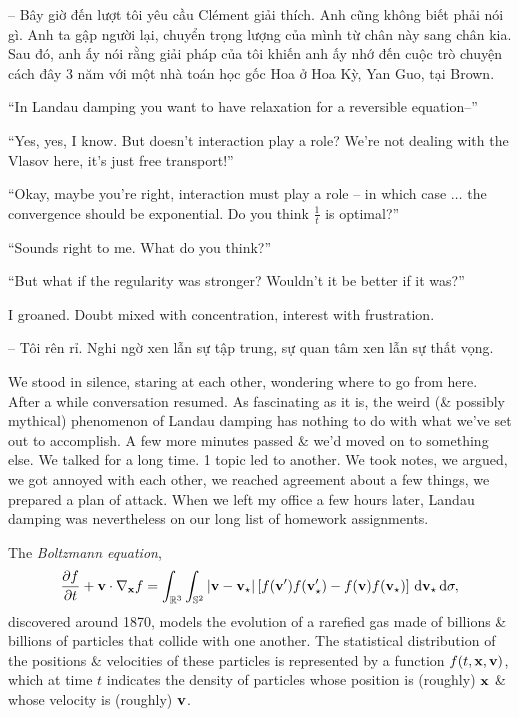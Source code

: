 \documentclass{article}
\begin{document}
\begin{enumerate}
	-- Bây giờ đến lượt tôi yêu cầu Cl\'ement giải thích. Anh cũng không biết phải nói gì. Anh ta gập người lại, chuyển trọng lượng của mình từ chân này sang chân kia. Sau đó, anh ấy nói rằng giải pháp của tôi khiến anh ấy nhớ đến cuộc trò chuyện cách đây 3 năm với một nhà toán học gốc Hoa ở Hoa Kỳ, Yan Guo, tại Brown.
	
	``In Landau damping you want to have relaxation for a reversible equation--''
	
	``Yes, yes, I know. But doesn't interaction play a role? We're not dealing with the Vlasov here, it's just free transport!''
	
	``Okay, maybe you're right, interaction must play a role -- in which case $\ldots$ the convergence should be exponential. Do you think $\frac{1}{t}$ is optimal?''
	
	``Sounds right to me. What do you think?''
	
	``But what if the regularity was stronger? Wouldn't it be better if it was?''
	
	I groaned. Doubt mixed with concentration, interest with frustration.
	
	-- Tôi rên rỉ. Nghi ngờ xen lẫn sự tập trung, sự quan tâm xen lẫn sự thất vọng.
	
	We stood in silence, staring at each other, wondering where to go from here. After a while conversation resumed. As fascinating as it is, the weird (\& possibly mythical) phenomenon of Landau damping has nothing to do with what we've set out to accomplish. A few more minutes passed \& we'd moved on to something else. We talked for a long time. 1 topic led to another. We took notes, we argued, we got annoyed with each other, we reached agreement about a few things, we prepared a plan of attack. When we left my office a few hours later, Landau damping was nevertheless on our long list of homework assignments.
	
	The {\it Boltzmann equation},
	\begin{equation*}
		\frac{\partial f}{\partial t} + {\bf v}\cdot\nabla_{\bf x}f = \int_{\mathbb{R}^3}\int_{\mathbb{S}^2} |{\bf v} - {\bf v}_\star|\left[f({\bf v}')f({\bf v}_\star') - f({\bf v})f({\bf v}_\star)\right]\,{\rm d}{\bf v}_\star\,{\rm d}\sigma,
	\end{equation*}
	discovered around 1870, models the evolution of a rarefied gas made of billions \& billions of particles that collide with one another. The statistical distribution of the positions \& velocities of these particles is represented by a function $f(t,{\bf x},{\bf v})$, which at time $t$ indicates the density of particles whose position is (roughly) $\bf x$ \& whose velocity is (roughly) $\bf v$.
	

\end{enumerate}
\end{document}
